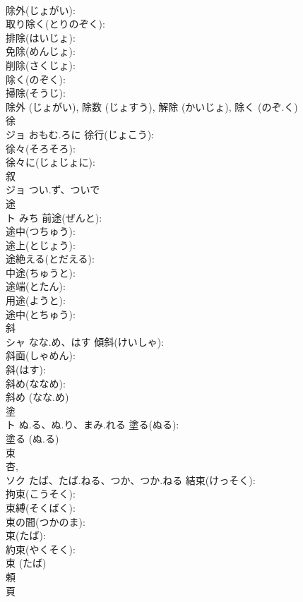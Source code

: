 \documentclass[8pt]{extreport}
\begin{document}
\begin{CJK}{UTF8}{min}
\\	除外(じょがい): 
\\	取り除く(とりのぞく): 
\\	排除(はいじょ): 
\\	免除(めんじょ): 
\\	削除(さくじょ): 
\\	除く(のぞく): 
\\	掃除(そうじ): 
\\	除外 (じょがい), 除数 (じょすう), 解除 (かいじょ), 除く (のぞ.く)
\\	徐			
\\	ジョ	おもむ.ろに	徐行(じょこう): 
\\	徐々(そろそろ): 
\\	徐々に(じょじょに): 
\\	叙			
\\	ジョ	つい.ず、ついで		
\\	途			
\\	ト	みち	前途(ぜんと): 
\\	途中(つちゅう): 
\\	途上(とじょう): 
\\	途絶える(とだえる): 
\\	中途(ちゅうと): 
\\	途端(とたん): 
\\	用途(ようと): 
\\	途中(とちゅう): 
\\	斜			
\\	シャ	なな.め、はす	傾斜(けいしゃ): 
\\	斜面(しゃめん): 
\\	斜(はす): 
\\	斜め(ななめ): 
\\	斜め (なな.め)
\\	塗			
\\	ト	ぬ.る、ぬ.り、まみ.れる	塗る(ぬる): 
\\	塗る (ぬ.る)
\\	束			
\\	杏, 
\\	ソク	たば、たば.ねる、つか、つか.ねる	結束(けっそく): 
\\	拘束(こうそく): 
\\	束縛(そくばく): 
\\	束の間(つかのま): 
\\	束(たば): 
\\	約束(やくそく): 
\\	束 (たば)
\\	頼			
\\	頁 

\end{CJK}
\end{document}
